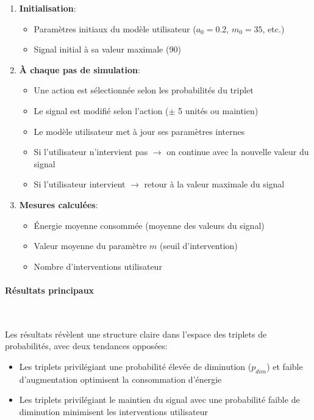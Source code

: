 \documentclass[a4paper,11pt]{article}
\begin{document}
\begin{enumerate}
    \item \textbf{Initialisation}:
    \begin{itemize}
        \item Paramètres initiaux du modèle utilisateur ($a_0=0.2$, $m_0=35$, etc.)
        \item Signal initial à sa valeur maximale (90)
    \end{itemize}
    
    \item \textbf{À chaque pas de simulation}:
    \begin{itemize}
        \item Une action est sélectionnée selon les probabilités du triplet
        \item Le signal est modifié selon l'action ($\pm$ 5 unités ou maintien)
        \item Le modèle utilisateur met à jour ses paramètres internes
        \item Si l'utilisateur n'intervient pas $\rightarrow$ on continue avec la nouvelle valeur du signal
        \item Si l'utilisateur intervient $\rightarrow$ retour à la valeur maximale du signal
    \end{itemize}
    
    \item \textbf{Mesures calculées}:
    \begin{itemize}
        \item Énergie moyenne consommée (moyenne des valeurs du signal)
        \item Valeur moyenne du paramètre $m$ (seuil d'intervention)
        \item Nombre d'interventions utilisateur
    \end{itemize}
\end{enumerate}

\paragraph{Résultats principaux} \

Les résultats révèlent une structure claire dans l'espace des triplets de probabilités, avec deux tendances opposées:

\begin{itemize}
    \item Les triplets privilégiant une probabilité élevée de diminution ($p_{dim}$) et faible d'augmentation optimisent la consommation d'énergie
    \item Les triplets privilégiant le maintien du signal avec une probabilité faible de diminution minimisent les interventions utilisateur
\end{itemize}
\end{document}
